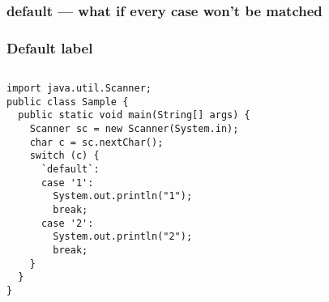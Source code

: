 \documentclass[en, 11pt, xcolor=dvipsnames]{beamer}
\begin{document}
\subsubsection{default --- what if every case won't be matched}
\begin{frame}[fragile]
	\frametitle{Default label}




	\begin{columns}[c]
		\begin{column}{0.98\textwidth}

			\begin{lstlisting}[style=Java]
import java.util.Scanner;
public class Sample {
  public static void main(String[] args) {
    Scanner sc = new Scanner(System.in);
    char c = sc.nextChar();
    switch (c) {
      `default`:
      case '1':
        System.out.println("1");
        break;
      case '2':
        System.out.println("2");
        break;
    }
  }
}
\end{lstlisting}

		\end{column}
	\end{columns}
\end{frame}
\end{document}

